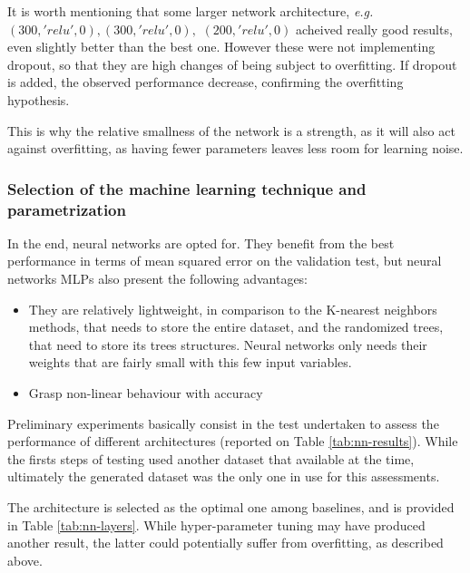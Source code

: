 It is worth mentioning that some larger network architecture, \textit{e.g.} $(300, 'relu', 0), (300, 'relu', 0),$ $(200, 'relu', 0)$ acheived really good results, even slightly better than the best one. However these were not implementing dropout, so that they are high changes of being subject to overfitting. If dropout is added, the observed performance decrease, confirming the overfitting hypothesis.

This is why the relative smallness of the network is a strength, as it will also act against overfitting, as having fewer parameters leaves less room for learning noise.

\subsubsection{Selection of the machine learning technique and parametrization}

In the end, neural networks are opted for. They benefit from the best performance in terms of mean squared error on the validation test, but neural networks MLPs also present the following advantages:
\begin{itemize}
    \item They are relatively lightweight, in comparison to the K-nearest neighbors methods, that needs to store the entire dataset, and the randomized trees, that need to store its trees structures. Neural networks only needs their weights that are fairly small with this few input variables.
    \item Grasp non-linear behaviour with accuracy
\end{itemize}

Preliminary experiments basically consist in the test undertaken to assess the performance of different architectures (reported on Table \ref{tab:nn-results}). While the firsts steps of testing used another dataset that available at the time, ultimately the generated dataset was the only one in use for this assessments.

The architecture is selected as the optimal one among baselines, and is provided in Table \ref{tab:nn-layers}. While hyper-parameter tuning may have produced another result, the latter could potentially suffer from overfitting, as described above. 

